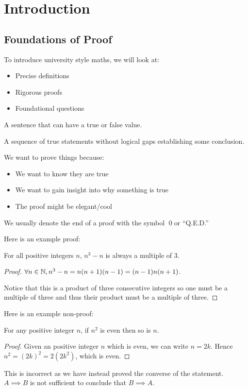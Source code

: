 \documentclass[../main.tex]{subfiles}
\begin{document}
\chapter{Introduction}
\section{Foundations of Proof}
To introduce university style maths, we will look at:
\begin{itemize}
  \item Precise definitions
  \item Rigorous proofs
  \item Foundational questions
\end{itemize}
\begin{definition}
  A sentence that can have a true or false value. 
\end{definition}
\begin{definition}[Proof]
  A sequence of true statements without logical gaps establishing some conclusion.
\end{definition}
We want to prove things because:
\begin{itemize}
  \item We want to know they are true
  \item We want to gain insight into why something is true
  \item The proof might be elegant/cool
\end{itemize}
We usually denote the end of a proof with the symbol \qed\;or ``Q.E.D.''

Here is an example proof:
\begin{proposition}
  For all positive integers $n$, $n^3 - n$ is always a multiple of 3.
\end{proposition}
\begin{proof}
  $\forall n \in \mathbb{N}, n^3 - n = n(n + 1)(n - 1) = (n - 1)n(n + 1)$.
  
  Notice that this is a product of three consecutive integers so one must be a multiple of three and thus their product must be a multiple of three.
\end{proof}
Here is an example non-proof:
\begin{proposition}
  For any positive integer $n$, if $n^2$ is even then so is $n$.
  \label{nEven}
\end{proposition}
\begin{proof}
  Given an positive integer $n$ which is even, we can write $n = 2k$.
  Hence $n^2 = (2k)^2 = 2(2k^2)$, which is even.
\end{proof}
This is incorrect as we have instead proved the converse of the statement.
$A \implies B$ is not sufficient to conclude that $B \implies A$.
\end{document}

